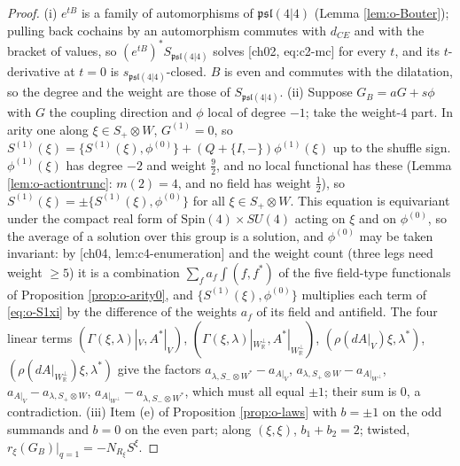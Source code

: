 \begin{proof}
(i) $e^{tB}$ is a family of automorphisms of $\mathfrak{psl}(4|4)$ (Lemma \ref{lem:o-Bouter}); pulling back cochains by an automorphism commutes with $d_{CE}$ and with the bracket of values, so $(e^{tB})^*S_{\mathfrak{psl}(4|4)}$ solves [ch02, eq:c2-mc] for every $t$, and its $t$-derivative at $t=0$ is $s_{\mathfrak{psl}(4|4)}$-closed. $B$ is even and commutes with the dilatation, so the degree and the weight are those of $S_{\mathfrak{psl}(4|4)}$. (ii) Suppose $G_B=aG+s\phi$ with $G$ the coupling direction and $\phi$ local of degree $-1$; take the weight-$4$ part. In arity one along $\xi\in S_+\otimes W$, $G^{(1)}=0$, so $S^{(1)}(\xi)=\{S^{(1)}(\xi),\phi^{(0)}\}+(Q+\{I,-\})\phi^{(1)}(\xi)$ up to the shuffle sign. $\phi^{(1)}(\xi)$ has degree $-2$ and weight $\tfrac92$, and no local functional has these (Lemma \ref{lem:o-actiontrunc}: $m(2)=4$, and no field has weight $\tfrac12$), so $S^{(1)}(\xi)=\pm\{S^{(1)}(\xi),\phi^{(0)}\}$ for all $\xi\in S_+\otimes W$. This equation is equivariant under the compact real form of $\mathrm{Spin}(4)\times SU(4)$ acting on $\xi$ and on $\phi^{(0)}$, so the average of a solution over this group is a solution, and $\phi^{(0)}$ may be taken invariant: by [ch04, lem:c4-enumeration] and the weight count (three legs need weight $\ge5$) it is a combination $\sum_fa_f\int(f,f^*)$ of the five field-type functionals of Proposition \ref{prop:o-arity0}, and $\{S^{(1)}(\xi),\phi^{(0)}\}$ multiplies each term of \eqref{eq:o-S1xi} by the difference of the weights $a_f$ of its field and antifield. The four linear terms $(\Gamma(\xi,\lambda)|_V,A^*|_V)$, $(\Gamma(\xi,\lambda)|_{W_{\mathbb R}^\perp},A^*|_{W_{\mathbb R}^\perp})$, $(\rho(dA|_V)\xi,\lambda^*)$, $(\rho(dA|_{W_{\mathbb R}^\perp})\xi,\lambda^*)$ give the factors $a_{\lambda,S_-\otimes W^*}-a_{A|_V}$, $a_{\lambda,S_+\otimes W}-a_{A|_{W^\perp}}$, $a_{A|_V}-a_{\lambda,S_+\otimes W}$, $a_{A|_{W^\perp}}-a_{\lambda,S_-\otimes W^*}$, which must all equal $\pm1$; their sum is $0$, a contradiction. (iii) Item (e) of Proposition \ref{prop:o-laws} with $b=\pm1$ on the odd summands and $b=0$ on the even part; along $(\xi,\xi)$, $b_1+b_2=2$; twisted, $r_\xi(G_B)|_{q=1}=-N_{R_\xi}S^\xi$.
\end{proof}

